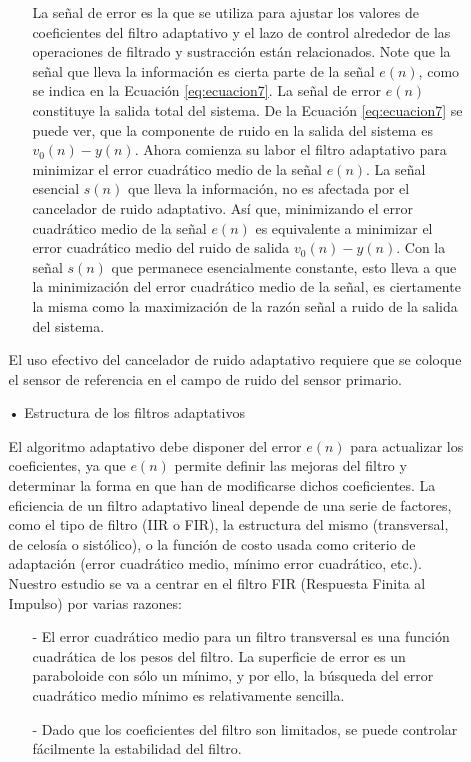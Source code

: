 \begin{enumerate}
\begin{enumerate}
\begin{enumerate}
La señal de error es la que se utiliza para ajustar los valores de coeficientes del filtro adaptativo y el lazo de control alrededor de las operaciones de filtrado y sustracción están relacionados. Note que la señal que lleva la información es cierta parte de la señal $e(n)$, como se indica en la Ecuación \eqref{eq:ecuacion7}.
\vskip 0.5cm
La señal de error $e(n)$ constituye la salida total del sistema. De la Ecuación \eqref{eq:ecuacion7} se puede ver, que la componente de ruido en la salida del sistema es $v_{0}(n) - y(n)$. Ahora comienza su labor el filtro adaptativo para minimizar el error cuadrático medio de la señal $e(n)$. La señal esencial $s(n)$ que lleva la información, no es afectada por el cancelador de ruido adaptativo.
\vskip 0.5cm
Así que, minimizando el error cuadrático medio de la señal $e(n)$ es equivalente a minimizar el error cuadrático medio del ruido de salida $v_{0}(n) - y(n)$. Con la señal $s(n)$ que permanece esencialmente constante, esto lleva a que la minimización del error cuadrático medio de la señal, es ciertamente la misma como la maximización de la razón señal a ruido de la salida del sistema.
\end{enumerate}
\vskip 0.5cm
El uso efectivo del cancelador de ruido adaptativo requiere que se coloque el sensor de referencia en el campo de ruido del sensor primario.
\vskip 0.5cm
\item[•]Estructura de los filtros adaptativos
\par
El algoritmo adaptativo debe disponer del error $e(n)$ para actualizar los coeficientes, ya que $e(n)$ permite definir las mejoras del filtro y determinar la forma en que han de modificarse dichos coeficientes. La eficiencia de un filtro adaptativo lineal depende de una serie de factores, como el tipo de filtro (IIR o FIR), la estructura del mismo (transversal, de celosía o sistólico), o la función de costo usada como criterio de adaptación (error cuadrático medio, mínimo error cuadrático, etc.).
\vskip 0.5cm
Nuestro estudio se va a centrar en el filtro FIR (Respuesta Finita al Impulso) por varias razones:
\begin{enumerate}
\item[-]El error cuadrático medio para un filtro transversal es una función cuadrática de los pesos del filtro. La superficie de error es un paraboloide con sólo un mínimo, y por ello, la búsqueda del error cuadrático medio mínimo es relativamente sencilla.
\item[-]Dado que los coeficientes del filtro son limitados, se puede controlar fácilmente la estabilidad del filtro.

\end{enumerate}
\end{enumerate}
\end{enumerate}
